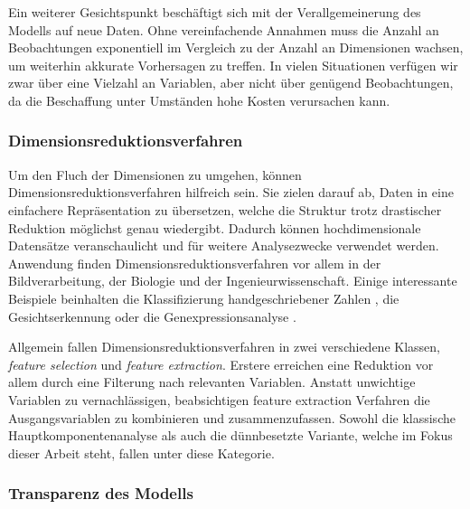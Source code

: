 Ein weiterer Gesichtspunkt beschäftigt sich mit der Verallgemeinerung des Modells auf neue Daten. Ohne vereinfachende Annahmen muss die Anzahl an Beobachtungen exponentiell im Vergleich zu der Anzahl an Dimensionen wachsen, um weiterhin akkurate Vorhersagen zu treffen. In vielen Situationen verfügen wir zwar über eine Vielzahl an Variablen, aber nicht über genügend Beobachtungen, da die Beschaffung unter Umständen hohe Kosten verursachen kann. 




\subsubsection{Dimensionsreduktionsverfahren}

Um den Fluch der Dimensionen zu umgehen, können Dimensionsreduktionsverfahren hilfreich sein. Sie zielen darauf ab, Daten in eine einfachere Repräsentation zu übersetzen, welche die Struktur trotz drastischer Reduktion möglichst genau wiedergibt. Dadurch können hochdimensionale Datensätze veranschaulicht und für weitere Analysezwecke verwendet werden. Anwendung finden Dimensionsreduktionsverfahren vor allem in der Bildverarbeitung, der Biologie und der Ingenieurwissenschaft. Einige interessante Beispiele beinhalten die Klassifizierung handgeschriebener Zahlen \cite{hastie_elements}, die Gesichtserkennung \cite{hancock} oder die Genexpressionsanalyse \cite{alter}.

Allgemein fallen Dimensionsreduktionsverfahren in zwei verschiedene Klassen, \textit{feature selection} und \textit{feature extraction}. Erstere erreichen eine Reduktion vor allem durch eine Filterung nach relevanten Variablen. Anstatt unwichtige Variablen zu vernachlässigen, beabsichtigen feature extraction Verfahren die Ausgangsvariablen zu kombinieren und zusammenzufassen. Sowohl die klassische Hauptkomponentenanalyse als auch die dünnbesetzte Variante, welche im Fokus dieser Arbeit steht, fallen unter diese Kategorie.




\subsubsection{Transparenz des Modells}


